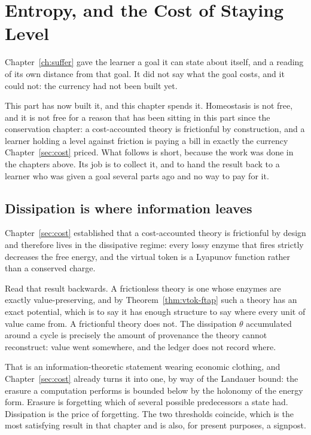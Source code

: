 \chapter{Entropy, and the Cost of Staying Level}
\label{ch:homeo-ent}

Chapter~\ref{ch:suffer} gave the learner a goal it can state about
itself, and a reading of its own distance from that goal.
It did not say what the goal costs, and it could not: the currency had
not been built yet.

This part has now built it, and this chapter spends it.
Homeostasis is not free, and it is not free for a reason that has been
sitting in this part since the conservation chapter: a cost-accounted
theory is frictionful by construction, and a learner holding a level
against friction is paying a bill in exactly the currency
Chapter~\ref{sec:cost} priced.
What follows is short, because the work was done in the chapters above.
Its job is to collect it, and to hand the result back to a learner who
was given a goal several parts ago and no way to pay for it.

\section{Dissipation is where information leaves}

Chapter~\ref{sec:cost} established that a cost-accounted theory is
frictionful by design and therefore lives in the dissipative regime:
every lossy enzyme that fires strictly decreases the free energy, and the
virtual token is a Lyapunov function rather than a conserved charge.

Read that result backwards.
A frictionless theory is one whose enzymes are exactly value-preserving,
and by Theorem~\ref{thm:vtok-ftap} such a theory has an exact potential,
which is to say it has enough structure to say where every unit of value
came from.
A frictionful theory does not.
The dissipation $\theta$ accumulated around a cycle is precisely the
amount of provenance the theory cannot reconstruct: value went somewhere,
and the ledger does not record where.

That is an information-theoretic statement wearing economic clothing, and
Chapter~\ref{sec:cost} already turns it into one, by way of the Landauer
bound: the erasure a computation performs is bounded below by the
holonomy of the energy form.
Erasure is forgetting which of several possible predecessors a state
had.
Dissipation is the price of forgetting.
The two thresholds coincide, which is the most satisfying result in that
chapter and is also, for present purposes, a signpost.

